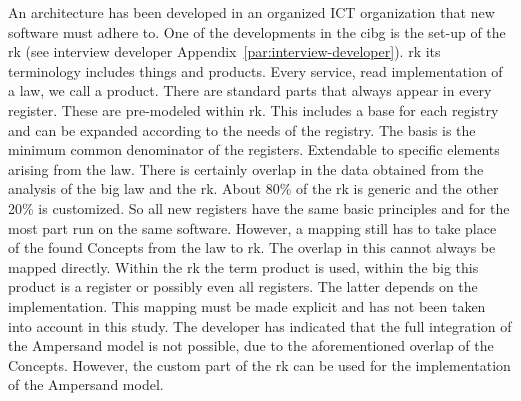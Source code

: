 An architecture has been developed in an organized ICT organization that new software must adhere to.
One of the developments in the \acrshort{cibg} is the set-up of the \acrshort{rk} (see interview developer Appendix~\ref{par:interview-developer}).
\acrlong{rk} its terminology includes things and products. 
Every service, read implementation of a law, we call a product.
There are standard parts that always appear in every register.
These are pre-modeled within \acrshort{rk}.
This includes a base for each registry and can be expanded according to the needs of the registry.
The basis is the minimum common denominator of the registers.
Extendable to specific elements arising from the law.
There is certainly overlap in the data obtained from the analysis of the big law and the \acrshort{rk}.
About 80\% of the \acrshort{rk} is generic and the other 20\% is customized.
So all new registers have the same basic principles and for the most part run on the same software.
However, a mapping still has to take place of the found Concepts from the law to \acrshort{rk}.
The overlap in this cannot always be mapped directly.
Within the \acrshort{rk} the term product is used, within the \acrshort{big} this product is a register or possibly even all registers.
The latter depends on the implementation.
This mapping must be made explicit and has not been taken into account in this study.
The developer has indicated that the full integration of the Ampersand model is not possible, due to the aforementioned overlap of the Concepts.
However, the custom part of the \acrshort{rk} can be used for the implementation of the Ampersand model.



